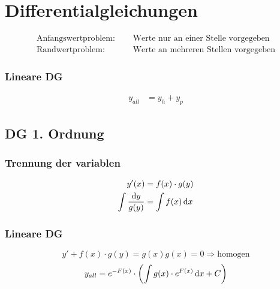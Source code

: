 \newpage
\section{Differentialgleichungen}

\begin{align*}
\text{Anfangswertproblem:}\quad&\text{ Werte nur an einer Stelle vorgegeben}\\
\text{Randwertproblem:}\quad&\text{ Werte an mehreren Stellen vorgegeben}
\end{align*}


\subsubsection*{Lineare DG}
\begin{align*}
y_{all}&=y_h+y_p
\end{align*}

\subsection{DG 1. Ordnung}
\begin{multicols}{2}
\subsubsection*{Trennung der variablen}
\begin{align*}
y'(x)&=f(x)\cdot g(y)\\
\int\frac{\mathop{}\!\mathrm{d} y}{g(y)}&=\int f(x)\mathop{}\!\mathrm{d} x
\end{align*}
\vfill
\subsubsection*{Lineare DG}
\[y'+f(x)\cdot g(y)=g(x) \text{$g(x)=0\Rightarrow$homogen}\]
\[y_{all}=e^{-F(x)}\cdot\left(\int g(x)\cdot e^{F(x)}\mathop{}\!\mathrm{d} x+C\right)\]
\vfill
\end{multicols}

